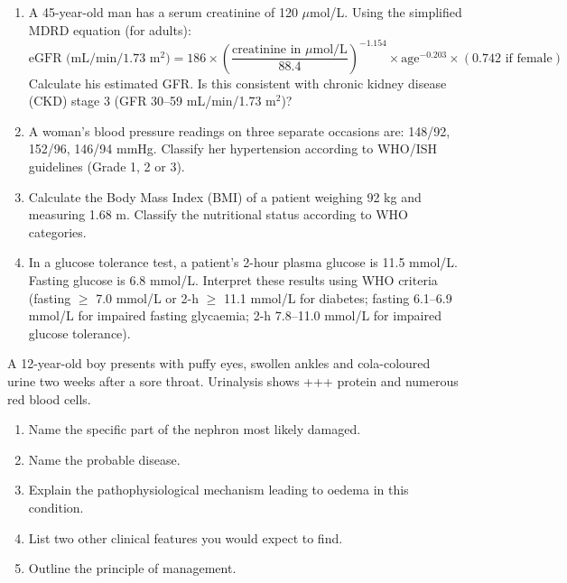 \documentclass[11pt]{article}
\newcounter{popsec}
\newcounter{popsub}
\newcommand{\courssub}[1]{%
  \stepcounter{popsub}%
  \par\vspace{9pt}\noindent{\popxbold\fontsize{11.5}{13}\selectfont\color{popink}{\color{poporange}\thepopsec.\thepopsub}\hspace{6pt}#1}\par\nopagebreak\vspace{4pt}
}
\begin{document}
\begin{exercice}
\begin{enumerate}
\item A 45-year-old man has a serum creatinine of 120 $\mu$mol/L. Using the simplified MDRD equation (for adults): 
\[ \text{eGFR (mL/min/1.73 m$^2$)} = 186 \times \left(\frac{\text{creatinine in } \mu\text{mol/L}}{88.4}\right)^{-1.154} \times \text{age}^{-0.203} \times (0.742 \text{ if female}) \]
Calculate his estimated GFR. Is this consistent with chronic kidney disease (CKD) stage 3 (GFR 30--59 mL/min/1.73 m$^2$)?
\item A woman's blood pressure readings on three separate occasions are: 148/92, 152/96, 146/94 mmHg. Classify her hypertension according to WHO/ISH guidelines (Grade 1, 2 or 3).
\item Calculate the Body Mass Index (BMI) of a patient weighing 92 kg and measuring 1.68 m. Classify the nutritional status according to WHO categories.
\item In a glucose tolerance test, a patient's 2-hour plasma glucose is 11.5 mmol/L. Fasting glucose is 6.8 mmol/L. Interpret these results using WHO criteria (fasting $\ge$ 7.0 mmol/L or 2-h $\ge$ 11.1 mmol/L for diabetes; fasting 6.1--6.9 mmol/L for impaired fasting glycaemia; 2-h 7.8--11.0 mmol/L for impaired glucose tolerance).
\end{enumerate}
\end{exercice}

\courssub{I practise}

\begin{exercice}
A 12-year-old boy presents with puffy eyes, swollen ankles and cola-coloured urine two weeks after a sore throat. Urinalysis shows +++ protein and numerous red blood cells.
\begin{enumerate}
\item Name the specific part of the nephron most likely damaged.
\item Name the probable disease.
\item Explain the pathophysiological mechanism leading to oedema in this condition.
\item List two other clinical features you would expect to find.
\item Outline the principle of management.
\end{enumerate}
\end{exercice}
\end{document}
